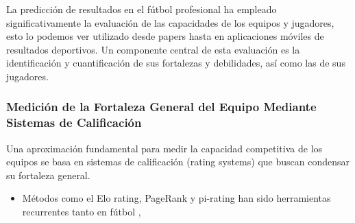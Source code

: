 La predicción de resultados en el fútbol profesional ha empleado significativamente la evaluación de las capacidades de los equipos y jugadores, esto lo podemos ver utilizado desde papers hasta en aplicaciones móviles de resultados deportivos. Un componente central de esta evaluación es la identificación y cuantificación de sus fortalezas y debilidades, así como las de sus jugadores.

\subsubsection{Medición de la Fortaleza General del Equipo Mediante Sistemas de Calificación}

Una aproximación fundamental para medir la capacidad competitiva de los equipos se basa en sistemas de calificación (rating systems) que buscan condensar su fortaleza general.

\begin{itemize}
    \item Métodos como el Elo rating, PageRank y pi-rating han sido herramientas recurrentes tanto en fútbol \cite{maclean_review_2022}, \cite{owenDynamicBayesianForecasting2011}
\end{itemize}
